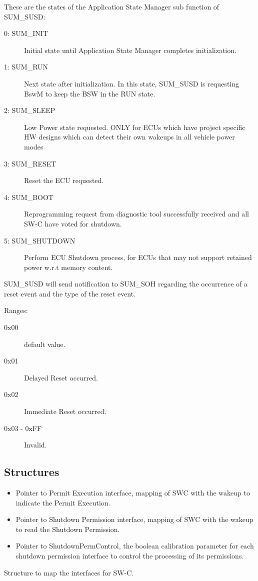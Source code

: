 {
{}
{These are the states of the Application State Manager sub function of SUM_SUSD:

\begin{description}
\item[0: SUM_INIT] Initial state until Application State Manager completes initialization.
\item[1: SUM_RUN] Next state after initialization. In this state, SUM_SUSD is requesting BswM to keep the BSW in the RUN state.
\item[2: SUM_SLEEP] Low Power state requested. ONLY for ECUs which have project specific HW designs which can detect their own wakeups in all vehicle power modes
\item[3: SUM_RESET] Reset the ECU requested.
\item[4: SUM_BOOT] Reprogramming request from diagnostic tool successfully received and all SW-C have voted for shutdown.
\item[5: SUM_SHUTDOWN] Perform ECU Shutdown process, for ECUs that may not support retained power w.r.t memory content.
\end{description}
}
}
{  }


{}
{SUM_SUSD will send notification to SUM_SOH regarding the occurrence of a reset event and the type of the reset event.

Ranges: 
\begin{description}
\item[0x00] default value.
\item[0x01] Delayed Reset occurred.
\item[0x02] Immediate Reset occurred.
\item[0x03 - 0xFF] Invalid.
\end{description}
}

\subsection{Structures}

{\begin{itemize}
\item Pointer to Permit Execution interface, mapping of SWC with the wakeup to indicate the Permit Execution.
\item Pointer to Shutdown Permission interface, mapping of SWC with the wakeup to read the Shutdown Permission.
\item Pointer to ShutdownPermControl, the boolean calibration parameter for each shutdown permission interface to control the processing of its permissions.
\end{itemize}}
{Structure to map the interfaces for SW-C.}

